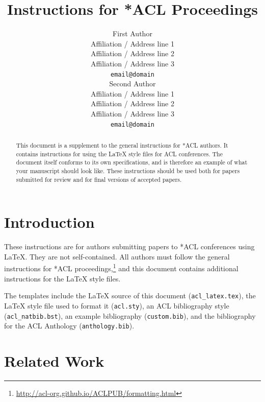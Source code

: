 \documentclass[11pt]{article}
\title{Instructions for *ACL Proceedings}
\author{First Author \\
  Affiliation / Address line 1 \\
  Affiliation / Address line 2 \\
  Affiliation / Address line 3 \\
  \texttt{email@domain} \\\And
  Second Author \\
  Affiliation / Address line 1 \\
  Affiliation / Address line 2 \\
  Affiliation / Address line 3 \\
  \texttt{email@domain} \\}
\begin{document}
\maketitle
\begin{abstract}
This document is a supplement to the general instructions for *ACL authors. It contains instructions for using the \LaTeX{} style files for ACL conferences.
The document itself conforms to its own specifications, and is therefore an example of what your manuscript should look like.
These instructions should be used both for papers submitted for review and for final versions of accepted papers.
\end{abstract}

\section{Introduction}

These instructions are for authors submitting papers to *ACL conferences using \LaTeX. They are not self-contained. All authors must follow the general instructions for *ACL proceedings,\footnote{\url{http://acl-org.github.io/ACLPUB/formatting.html}} and this document contains additional instructions for the \LaTeX{} style files.

The templates include the \LaTeX{} source of this document (\texttt{acl\_latex.tex}),
the \LaTeX{} style file used to format it (\texttt{acl.sty}),
an ACL bibliography style (\texttt{acl\_natbib.bst}),
an example bibliography (\texttt{custom.bib}),
and the bibliography for the ACL Anthology (\texttt{anthology.bib}).



\section{Related Work}
 
\end{document}
